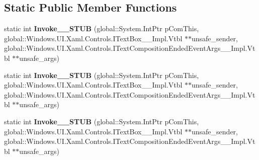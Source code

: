 \subsection*{Static Public Member Functions}
\begin{DoxyCompactItemize}
\item 
\mbox{\label{struct_windows_1_1_foundation_1_1_typed_event_handler___a___windows___u_i___xaml___controls___te0b4df93de6e851b0934d485b06536178_a92e6d4444b6b1cb2224285433b960bb9}} 
static int {\bfseries Invoke\+\_\+\+\_\+\+S\+T\+UB} (global\+::\+System.\+Int\+Ptr p\+Com\+This, global\+::\+Windows.\+U\+I.\+Xaml.\+Controls.\+I\+Text\+Box\+\_\+\+\_\+\+Impl.\+Vtbl $\ast$$\ast$unsafe\+\_\+sender, global\+::\+Windows.\+U\+I.\+Xaml.\+Controls.\+I\+Text\+Composition\+Ended\+Event\+Args\+\_\+\+\_\+\+Impl.\+Vtbl $\ast$$\ast$unsafe\+\_\+args)
\item 
\mbox{\label{struct_windows_1_1_foundation_1_1_typed_event_handler___a___windows___u_i___xaml___controls___te0b4df93de6e851b0934d485b06536178_a92e6d4444b6b1cb2224285433b960bb9}} 
static int {\bfseries Invoke\+\_\+\+\_\+\+S\+T\+UB} (global\+::\+System.\+Int\+Ptr p\+Com\+This, global\+::\+Windows.\+U\+I.\+Xaml.\+Controls.\+I\+Text\+Box\+\_\+\+\_\+\+Impl.\+Vtbl $\ast$$\ast$unsafe\+\_\+sender, global\+::\+Windows.\+U\+I.\+Xaml.\+Controls.\+I\+Text\+Composition\+Ended\+Event\+Args\+\_\+\+\_\+\+Impl.\+Vtbl $\ast$$\ast$unsafe\+\_\+args)
\item 
\mbox{\label{struct_windows_1_1_foundation_1_1_typed_event_handler___a___windows___u_i___xaml___controls___te0b4df93de6e851b0934d485b06536178_a92e6d4444b6b1cb2224285433b960bb9}} 
static int {\bfseries Invoke\+\_\+\+\_\+\+S\+T\+UB} (global\+::\+System.\+Int\+Ptr p\+Com\+This, global\+::\+Windows.\+U\+I.\+Xaml.\+Controls.\+I\+Text\+Box\+\_\+\+\_\+\+Impl.\+Vtbl $\ast$$\ast$unsafe\+\_\+sender, global\+::\+Windows.\+U\+I.\+Xaml.\+Controls.\+I\+Text\+Composition\+Ended\+Event\+Args\+\_\+\+\_\+\+Impl.\+Vtbl $\ast$$\ast$unsafe\+\_\+args)
\item 
\mbox{\label{struct_windows_1_1_foundation_1_1_typed_event_handler___a___windows___u_i___xaml___controls___te0b4df93de6e851b0934d485b06536178_a92e6d4444b6b1cb2224285433b960bb9}} 

\end{DoxyCompactItemize}
